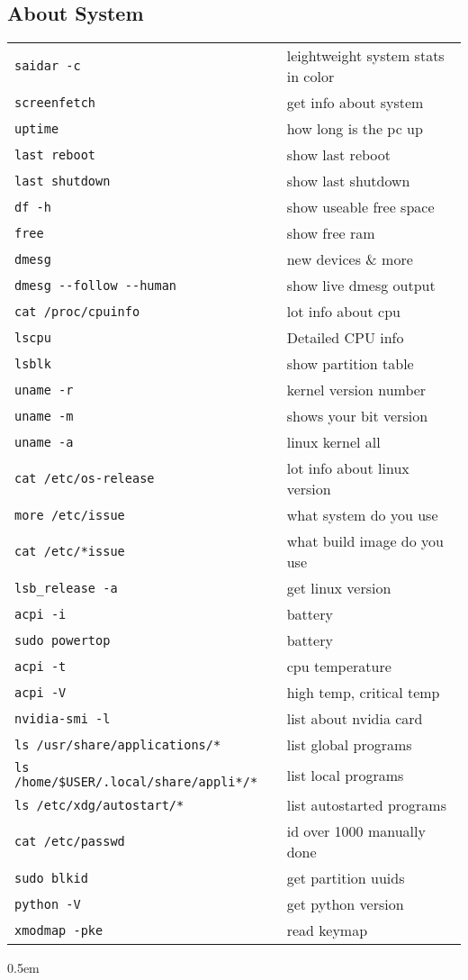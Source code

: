\documentclass[fontsize=6pt,paper=a4,paper=landscape,twoside=false,parskip=half,
headings=small,numbers=withenddot,usegeometry=true,english]{scrartcl}
\providecommand{\sectionbox}[1]{{\fboxsep0.5em\hspace*{-1.5\fboxsep}%
 \fcolorbox{gray}{gray!3}{%
 \parbox{\columnwidth}{%
 \raggedright #1}}}}
\begin{document}
\begin{multicols}{4}
{	\subsection{About System}\label{sec:aboutsystem}
	\begin{tabular}{@{}ll@{}}\toprule
		\texttt{saidar -c}  &  leightweight system stats in color\\
		\texttt{screenfetch}  &  get info about system\\
		\texttt{uptime}  &  how long is the pc up\\
		\texttt{last reboot}  &  show last reboot\\
		\texttt{last shutdown}  &  show last shutdown\\
		\texttt{df -h}  &  show useable free space\\
		\texttt{free}  &  show free ram\\
		\texttt{dmesg}  &  new devices \& more\\
		\texttt{dmesg -{}-follow -{}-human}  &  show live dmesg output\\
		\texttt{cat /proc/cpuinfo}  &  lot info about cpu\\
		\texttt{lscpu}  &  Detailed CPU info\\
		\texttt{lsblk}  &  show partition table\\
		\texttt{uname -r}  &  kernel version number\\
		\texttt{uname -m}  &  shows your bit version\\
		\texttt{uname -a}  &  linux kernel all\\
		\texttt{cat /etc/os-release}  &  lot info about linux version\\
		\texttt{more /etc/issue}  &  what system do you use\\
		\texttt{cat /etc/*issue}  &  what build image do you use\\
		\texttt{lsb\_release -a}  &  get linux version\\
		\texttt{acpi -i}  &  battery\\
		\texttt{sudo powertop}  &  battery\\
		\texttt{acpi -t}  &  cpu temperature\\
		\texttt{acpi -V}  &  high temp, critical temp\\
		\texttt{nvidia-smi -l}  &  list about nvidia card\\
		\texttt{ls /usr/share/applications/*}  &  list global programs\\
		\texttt{ls /home/\$USER/.local/share/appli*/*}  &  list local programs\\
		\texttt{ls /etc/xdg/autostart/*}  &  list autostarted programs\\
		\texttt{cat /etc/passwd}  &   id over 1000 manually done\\
		\texttt{sudo blkid}  &  get partition uuids\\
		\texttt{python -V}  &  get python version\\
		\texttt{xmodmap -pke}  &  read keymap\\
		\bottomrule
	\end{tabular}
}
\sectionbox{
}
\end{multicols}
\end{document}
